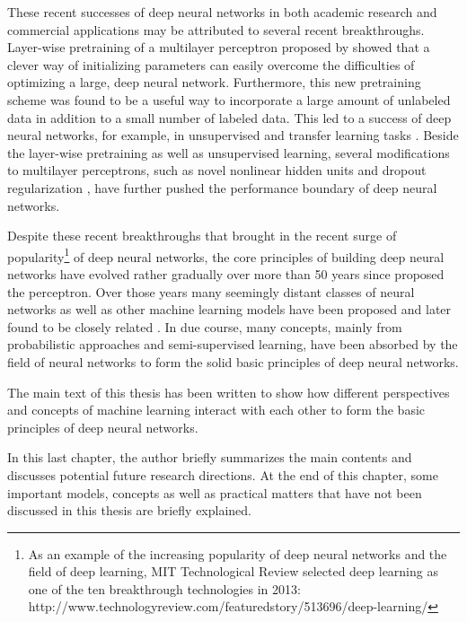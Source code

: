 \documentclass[dissertation,nocontribution]{aaltoseries}
\begin{document}
These recent successes of deep neural networks in both
academic research and commercial applications may be
attributed to several recent breakthroughs. Layer-wise
pretraining of a multilayer perceptron proposed by
\citep{Hinton2006,Bengio2007nips,Ranzato2007} showed that a
clever way of initializing parameters can easily overcome
the difficulties of optimizing a large, deep neural network.
Furthermore, this new pretraining scheme was found to be a
useful way to incorporate a large amount of unlabeled data
in addition to a small number of labeled data. This led to a
success of deep neural networks, for example, in
unsupervised and transfer learning tasks \citep[see,
e.g.,]{Guyon2011,Mesnil2012,Raina2007}. Beside the
layer-wise pretraining as well as unsupervised learning,
several modifications to multilayer perceptrons, such as
novel nonlinear hidden units \citep[see,
e.g.,][]{Nair2010,Glorot2011,Goodfellow2013} and dropout
regularization \citep{Hinton2012}, have further pushed the
performance boundary of deep neural networks. 

Despite these recent breakthroughs that brought in the
recent surge of popularity\footnote{As an example of the
increasing popularity of deep neural networks and the field
of deep learning, MIT Technological Review selected deep
learning as one of the ten breakthrough technologies in
2013:
\\http://www.technologyreview.com/featuredstory/513696/deep-learning/
} of deep neural networks, the core principles of building
deep neural networks have evolved rather gradually over more
than 50 years since \citet{Rosenblatt1958} proposed the
perceptron. Over those years many seemingly distant classes
of neural networks as well as other machine learning models
have been proposed and later found to be closely related
\citep[see, e.g.,][]{Haykin2009}. In due course, many
concepts, mainly from probabilistic approaches and
semi-supervised learning, have been absorbed by the field of
neural networks to form the solid basic principles of deep
neural networks.

The main text of this thesis has been written to show how
different perspectives and concepts of machine learning
interact with each other to form the basic principles of deep
neural networks. 

In this last chapter, the author briefly summarizes the main
contents and discusses potential future
research directions. At the end of this chapter, some
important models, concepts as well as practical matters that
have not been discussed in this thesis are briefly
explained.
\end{document}

